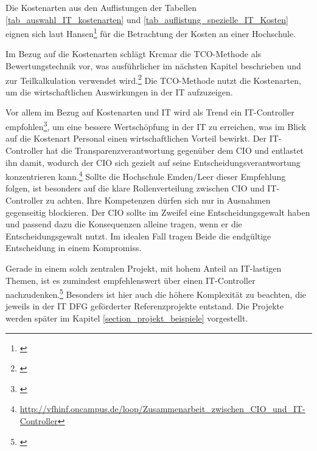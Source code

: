 Die Kostenarten aus den Auflistungen der Tabellen \ref{tab_auswahl_IT_kostenarten} und \ref{tab_auflistung_spezielle_IT_Kosten} eignen sich laut Hansen\footnote{\autocite[493-498]{hansen_business_2009}} für die Betrachtung der Kosten an einer Hochschule.

Im Bezug auf die Kostenarten schlägt Krcmar die TCO-Methode als Bewertungstechnik vor, was ausführlicher im nächsten Kapitel beschrieben und zur Teilkalkulation verwendet wird.\footnote{\autocite[144]{krcmar_einfuhrung_2015}} Die TCO-Methode nutzt die Kostenarten, um die wirtschaftlichen Auswirkungen in der IT aufzuzeigen.

\clearpage

Vor allem im Bezug auf Kostenarten und IT wird als Trend ein IT-Controller empfohlen\footnote{\autocite[49]{gadatsch_masterkurs_2014}}, um eine bessere Wertschöpfung in der IT zu erreichen, was im Blick auf die Kostenart Personal einen wirtschaftlichen Vorteil bewirkt. Der IT-Controller hat die Transparenzverantwortung gegenüber dem CIO und entlastet ihn damit, wodurch der CIO sich gezielt auf seine Entscheidungsverantwortung konzentrieren kann.\footnote{\url{http://vfhinf.oncampus.de/loop/Zusammenarbeit_zwischen_CIO_und_IT-Controller}} Sollte die Hochschule Emden/Leer dieser Empfehlung folgen, ist besonders auf die klare Rollenverteilung zwischen CIO und IT-Controller zu achten. Ihre Kompetenzen dürfen sich nur in Ausnahmen gegenseitig blockieren. Der CIO sollte im Zweifel eine Entscheidungsgewalt haben und passend dazu die Konsequenzen alleine tragen, wenn er die Entscheidungsgewalt nutzt. Im idealen Fall tragen Beide die endgültige Entscheidung in einem Kompromiss.

Gerade in einem solch zentralen Projekt, mit hohem Anteil an IT-lastigen Themen, ist es zumindest empfehlenswert über einen IT-Controller nachzudenken.\footnote{\autocite[11-15]{stratmann_it_2013}} Besonders ist hier auch die höhere Komplexität zu beachten, die jeweils in der IT DFG geförderter Referenzprojekte entstand. Die Projekte werden später im Kapitel \ref{section_projekt_beispiele} vorgestellt.

